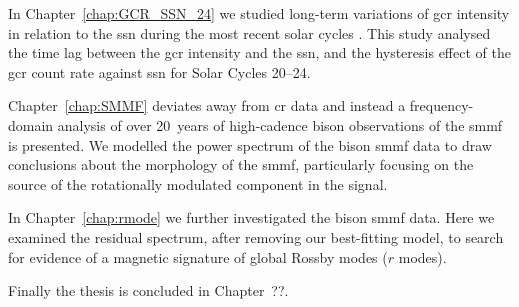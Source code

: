 In Chapter~\ref{chap:GCR_SSN_24} we studied long-term variations of \gls{gcr} intensity in relation to the \gls{ssn} during the most recent solar cycles \citep{ross_behaviour_2019}. This study analysed the time lag between the \gls{gcr} intensity and the \gls{ssn}, and the hysteresis effect of the \gls{gcr} count rate against \gls{ssn} for Solar Cycles 20--24.

Chapter~\ref{chap:SMMF} deviates away from \gls{cr} data and instead a frequency-domain analysis of over 20~years of high-cadence \gls{bison} observations of the \gls{smmf} is presented. We modelled the power spectrum of the \gls{bison} \gls{smmf} data to draw conclusions about the morphology of the \gls{smmf}, particularly focusing on the source of the rotationally modulated component in the signal.

In Chapter~\ref{chap:rmode} we further investigated the \gls{bison} \gls{smmf} data. Here we examined the residual spectrum, after removing our best-fitting model, to search for evidence of a magnetic signature of global Rossby modes ($r$ modes).

Finally the thesis is concluded in Chapter~??.